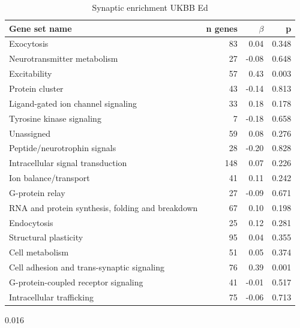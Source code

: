 \begin{table}[ht]
\centering
\begin{tabular}{lrrr}
   \toprule
Gene set name & n genes & $\beta$ & p\\
  \midrule
Exocytosis & 83 & 0.04 & 0.348 \\ 
  Neurotransmitter metabolism & 27 & -0.08 & 0.648 \\ 
  Excitability & 57 & 0.43 & 0.003 \\ 
  Protein cluster & 43 & -0.14 & 0.813 \\ 
  Ligand-gated ion channel signaling & 33 & 0.18 & 0.178 \\ 
  Tyrosine kinase signaling & 7 & -0.18 & 0.658 \\ 
  Unassigned & 59 & 0.08 & 0.276 \\ 
  Peptide/neurotrophin signals & 28 & -0.20 & 0.828 \\ 
  Intracellular signal transduction & 148 & 0.07 & 0.226 \\ 
  Ion balance/transport & 41 & 0.11 & 0.242 \\ 
  G-protein relay & 27 & -0.09 & 0.671 \\ 
  RNA and protein synthesis, folding and breakdown & 67 & 0.10 & 0.198 \\ 
  Endocytosis & 25 & 0.12 & 0.281 \\ 
  Structural plasticity & 95 & 0.04 & 0.355 \\ 
  Cell metabolism & 51 & 0.05 & 0.374 \\ 
  Cell adhesion and trans-synaptic signaling & 76 & 0.39 & 0.001 \\ 
  G-protein-coupled receptor signaling & 41 & -0.01 & 0.517 \\ 
  Intracellular trafficking & 75 & -0.06 & 0.713 \\ 
   \hline
   \bottomrule
\end{tabular}
\caption{Synaptic enrichment UKBB Ed} 
\label{tab:MAGMA enrichment of synaptic groups UKBBEd}
\end{table}0.016 

